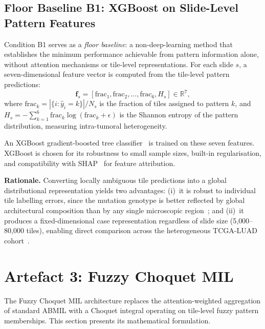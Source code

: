 \subsection{Floor Baseline B1: XGBoost on Slide-Level Pattern Features}
\label{sec:meth:mutation:xgboost}

Condition B1 serves as a \emph{floor baseline}: a non-deep-learning
method that establishes the minimum performance achievable from
pattern information alone, without attention mechanisms or
tile-level representations.
For each slide $s$, a seven-dimensional feature vector is computed from the tile-level pattern predictions:
\begin{equation}
\label{eq:xgboost_features}
\mathbf{f}_s = \left[\text{frac}_1, \text{frac}_2, \ldots, \text{frac}_6, H_s\right] \in \mathbb{R}^7,
\end{equation}
where $\text{frac}_k = |\{i : \hat{y}_i = k\}| / N_s$ is the fraction of tiles assigned to pattern $k$, and $H_s = -\sum_{k=1}^{6} \text{frac}_k \log(\text{frac}_k + \epsilon)$ is the Shannon entropy of the pattern distribution, measuring intra-tumoral heterogeneity.

An XGBoost gradient-boosted tree classifier~\cite{chen2016xgboost} is trained on these seven features.
XGBoost is chosen for its robustness to small sample sizes, built-in regularisation, and compatibility with SHAP~\cite{lundberg2017shap} for feature attribution.

\textbf{Rationale.}
Converting locally ambiguous tile predictions into a global distributional
representation yields two advantages:
(i)~it is robust to individual tile labelling errors, since the mutation
genotype is better reflected by global architectural composition than by
any single microscopic region~\cite{coudray2018classification}; and
(ii)~it produces a fixed-dimensional case representation regardless of
slide size (5{,}000--80{,}000 tiles), enabling direct comparison across
the heterogeneous TCGA-LUAD cohort~\cite{tcga2014luad}.
 

\section{Artefact 3: Fuzzy Choquet MIL}
\label{sec:meth:choquet_mil}

The Fuzzy Choquet MIL architecture replaces the attention-weighted aggregation of standard ABMIL with a Choquet integral operating on tile-level fuzzy pattern memberships.
This section presents its mathematical formulation.

